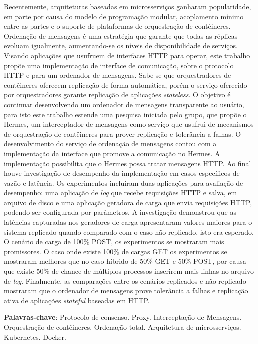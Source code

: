 \setlength{\absparsep}{18pt}
\begin{resumo}
\SingleSpacing

Recentemente, arquiteturas baseadas em microsserviços ganharam popularidade, em parte por causa do modelo de programação modular, acoplamento mínimo entre as partes e o suporte de plataformas de orquestração de contêineres. Ordenação de mensagens é uma estratégia que garante que todas as réplicas evoluam igualmente, aumentando-se os níveis de disponibilidade de serviços. Visando aplicações que usufruem de interfaces \gls{HTTP} para operar, este trabalho propõe uma implementação de interface de comunicação, sobre o protocolo HTTP e para um ordenador de mensagens. Sabe-se que orquestradores de contêineres oferecem replicação de forma automática, porém o serviço oferecido por orquestradores garante replicação de aplicações \textit{stateless}. O objetivo é continuar desenvolvendo um ordenador de mensagens transparente ao usuário, para isto este trabalho estende uma pesquisa iniciada pelo grupo, que propõe o Hermes, um interceptador de mensagens como serviço que usufrui de mecanismos de orquestração de contêineres para prover replicação e tolerância a falhas. O desenvolvimento do serviço de ordenação de mensagens contou com a implementação da interface que promove a comunicação no Hermes. A implementação possibilita que o Hermes possa tratar mensagens \gls{HTTP}. Ao final houve investigação de desempenho da implementação em casos específicos de vazão e latência. Os experimentos incluíram duas aplicações para avaliação de desempenho: uma aplicação de \textit{log} que recebe requisições HTTP e salva, em arquivo de disco e uma aplicação geradora de carga que envia requisições HTTP, podendo ser configurada por parâmetros. A investigação demonstrou que as latências capturadas nos geradores de carga apresentaram valores maiores para o sistema replicado quando comparado com o caso não-replicado, isto era esperado. O cenário de carga de 100\% POST, os experimentos se mostraram mais promissores. O caso onde existe 100\% de cargas GET os experimentos se mostraram melhores que no caso híbrido de 50\% GET e 50\% POST, por causa que existe 50\% de chance de múltiplos processos inserirem mais linhas no arquivo de \textit{log}. Finalmente, as comparações entre os cenários replicados e não-replicado mostraram que o ordenador de mensagens prove tolerância a falhas e replicação ativa de aplicações \textit{stateful} baseadas em HTTP.

\textbf{Palavras-chave}: Protocolo de consenso. Proxy. Interceptação de Mensagens. Orquestração de contêineres. Ordenação total. Arquitetura de microsserviços. Kubernetes. Docker.
\end{resumo}
